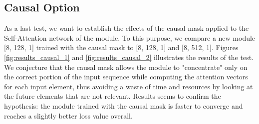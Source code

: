         \subsection{Causal Option}
            As a last test, we want to establish the effects of the causal mask applied to the Self-Attention network of the module. To this purpose, we compare a new module [8, 128, 1] trained with the causal mask to [8, 128, 1] and [8, 512, 1]. Figures \ref{fig:results_causal_1} and \ref{fig:results_causal_2} illustrates the results of the test. \newline We conjecture that the causal mask allows the module to "concentrate" only on the correct portion of the input sequence while computing the attention vectors for each input element, thus avoiding a waste of time and resources by looking at the future elements that are not relevant. Results seems to confirm the hypothesis: the module trained with the causal mask is faster to converge and reaches a slightly better loss value overall.
        

